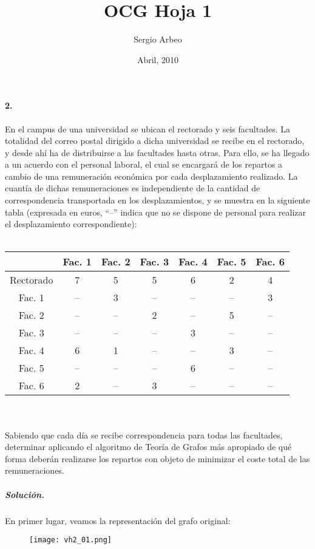 \documentclass[12pt, oneside, a4paper]{article}
\begin{document}
\title{OCG Hoja 1}\author{Sergio Arbeo}\date{Abril, 2010}\maketitle
\paragraph{2.}\label{ssub:1_} %
En el campus de una universidad se ubican el rectorado y seis
facultades. La totalidad del correo postal dirigido a dicha
universidad se recibe en el rectorado, y desde ahí ha de distribuirse
a las facultades hasta otras. Para ello, se ha llegado a un acuerdo
con el personal laboral, el cual se encargará de los repartos a cambio
de una remuneración económica por cada desplazamiento realizado. La
cuantía de dichas remuneraciones es independiente de la cantidad de
correspondencia transportada en los desplazamientos, y se muestra en
la siguiente tabla (expresada en euros, ``--'' indica que no se
dispone de personal para realizar el desplazamiento correspondiente):
\\
\\

\begin{tabular}{| c | c | c | c | c | c | c | }
\hline
          & Fac. 1 & Fac. 2 & Fac. 3 & Fac. 4 & Fac. 5 & Fac. 6\\
\hline
Rectorado &   7    &   5    &   5    &   6    &   2    &   4   \\ 
\hline
Fac. 1    &  --    &   3    &  --    &  --    &  --    &   3   \\
\hline
Fac. 2    &  --    &  --    &   2    &  --    &   5    &  --   \\
\hline
Fac. 3    &  --    &  --    &  --    &   3    &  --    &  --   \\
\hline
Fac. 4    &   6    &   1    &  --    &  --    &   3    &  --   \\
\hline
Fac. 5    &  --    &  --    &  --    &   6    &  --    &  --   \\
\hline
Fac. 6    &   2    &  --    &   3    &  --    &  --    &  --   \\
\hline
\end{tabular}
\\
\\

Sabiendo que cada día se recibe correspondencia para todas las
facultades, determinar aplicando el algoritmo de Teoría de Grafos más
apropiado de qué forma deberán realizarse los repartos con objeto de
minimizar el coste total de las remuneraciones.


\subparagraph{Solución.\\}

En primer lugar, veamos la representación del grafo original:
\begin{figure}[h]
\centering
\texttt{[image: vh2\_01.png]}
\end{figure}
\end{document}
